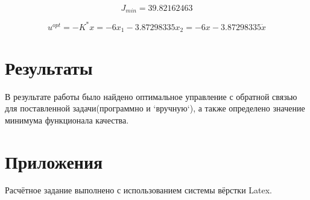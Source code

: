\documentclass[12pt]{article}
\begin{document}
\begin{equation}
J_{min} = 39.82162463 
\end{equation}

\begin{equation}
 u^{opt} = -K^*x = -6x_1 - 3.87298335x_2 = -6x - 3.87298335\dot x
\end{equation}

\section{Результаты}
В результате работы было найдено оптимальное управление с обратной связью для поставленной задачи(программно и `вручную`), а также определено значение минимума функционала качества.

\section{Приложения}
Расчётное задание выполнено с использованием системы вёрстки Latex.
\end{document}
